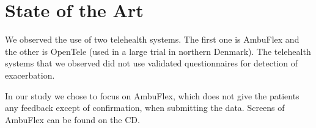 \section{State of the Art}
We observed the use of two telehealth systems. The first one is AmbuFlex and the other is OpenTele (used in a large trial in northern Denmark). The telehealth systems that we observed did not use validated questionnaires for detection of exacerbation. 

In our study we chose to focus on AmbuFlex, which does not give the patients any feedback except of confirmation, when submitting the data. Screens of AmbuFlex can be found on the CD.